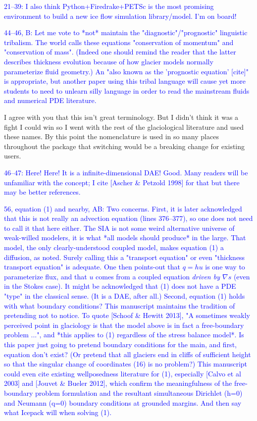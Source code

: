 \documentclass{article}
\theoremstyle{definition}
\theoremstyle{plain}
\begin{document}
\textcolor{blue}{21--39:  I also think Python+Firedrake+PETSc is the most promising environment to build a new ice flow simulation library/model.  I'm on board!}

\textcolor{blue}{44--46, B:  Let me vote to *not* maintain the "diagnostic"/"prognostic" linguistic tribalism.  The world calls these equations "conservation of momentum" and "conservation of mass".  (Indeed one should remind the reader that the latter describes thickness evolution because of how glacier models normally parameterize fluid geometry.)  An "also known as the 'prognostic equation' [cite]" is appropriate, but another paper using this tribal language will cause yet more students to need to unlearn silly language in order to read the mainstream fluids and numerical PDE literature.}

I agree with you that this isn't great terminology.
But I didn't think it was a fight I could win so I went with the rest of the glaciological literature and used these names.
By this point the nomenclature is used in so many places throughout the package that switching would be a breaking change for existing users.

\textcolor{blue}{46--47:  Here!  Here!  It is a infinite-dimensional DAE!  Good.  Many readers will be unfamiliar with the concept; I cite [Ascher \& Petzold 1998] for that but there may be better references.}

\textcolor{blue}{56, equation (1) and nearby, AB:  Two concerns.  First, it is later acknowledged that this is not really an advection equation (lines 376--377), so one does not need to call it that here either.  The SIA is not some weird alternative universe of weak-willed modelers, it is what *all models should produce* in the large.  That model, the only clearly-understood coupled model, makes equation (1) a diffusion, as noted.  Surely calling this a "transport equation" or even "thickness transport equation" is adequate.  One then points-out that $q=hu$ is one way to parameterize flux, and that $u$ comes from a coupled equation \emph{driven by $\nabla s$} (even in the Stokes case).  It might be acknowledged that (1) does not have a PDE "type" in the classical sense.  (It is a DAE, after all.)  Second, equation (1) holds with what boundary conditions?  This manuscript maintains the tradition of pretending not to notice.  To quote [Schoof \& Hewitt 2013], "A sometimes weakly perceived point in glaciology is that the model above is in fact a free-boundary problem ...", and *this applies to (1) regardless of the stress balance model*.  Is this paper just going to pretend boundary conditions for the main, and first, equation don't exist?  (Or pretend that all glaciers end in cliffs of sufficient height so that the singular change of coordinates (16) is no problem?)  This manuscript could even cite existing wellposedness literature for (1), especially [Calvo et al 2003] and [Jouvet \& Bueler 2012], which confirm the meaningfulness of the free-boundary problem formulation and the resultant simultaneous Dirichlet (h=0) and Neumann (q=0) boundary conditions at grounded margins.  And then say what Icepack will when solving (1).}
\end{document}
